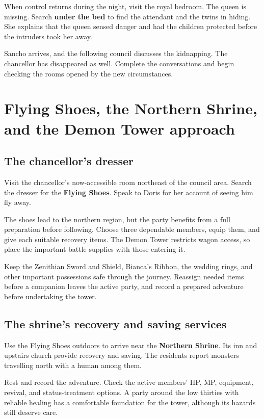 When control returns during the night, visit the royal bedroom.
The queen is missing. Search \textbf{under the bed} to find
the attendant and the twins in hiding. She explains that the
queen sensed danger and had the children protected before the
intruders took her away.

Sancho arrives, and the following council discusses the kidnapping.
The chancellor has disappeared as well. Complete the conversations
and begin checking the rooms opened by the new circumstances.

\section{Flying Shoes, the Northern Shrine, and the Demon Tower approach}

\subsection*{The chancellor's dresser}

Visit the chancellor's now-accessible room northeast of the
council area. Search the dresser for the \textbf{Flying Shoes}.
Speak to Doris for her account of seeing him fly away.

The shoes lead to the northern region, but the party benefits
from a full preparation before following. Choose three dependable
members, equip them, and give each suitable recovery items. The
Demon Tower restricts wagon access, so place the important battle
supplies with those entering it.

Keep the Zenithian Sword and Shield, Bianca's Ribbon, the wedding
rings, and other important possessions safe through the journey.
Reassign needed items before a companion leaves the active party,
and record a prepared adventure before undertaking the tower.

\subsection*{The shrine's recovery and saving services}

Use the Flying Shoes outdoors to arrive near the
\textbf{Northern Shrine}. Its inn and upstairs church provide
recovery and saving. The residents report monsters travelling
north with a human among them.

Rest and record the adventure. Check the active members' HP,
MP, equipment, revival, and status-treatment options. A party
around the low thirties with reliable healing has a comfortable
foundation for the tower, although its hazards still deserve care.

